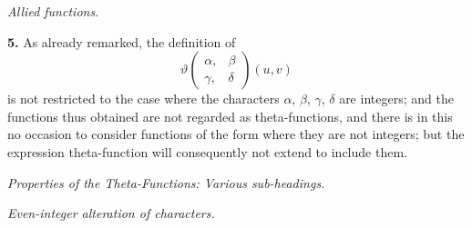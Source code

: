 \documentclass[11pt,a4paper]{book}
\begin{document}
\begin{center}
\textit{Allied functions.}
\end{center}

\vspace{0.5em}

\noindent\textbf{5.}\quad
As already remarked, the definition of
\[
\vartheta\begin{pmatrix} \alpha, & \beta \\ \gamma, & \delta \end{pmatrix}(u, v)
\]
is not restricted to the case where the characters $\alpha$, $\beta$, $\gamma$, $\delta$ are integers; and the functions thus obtained are not regarded as theta-functions, and there is in this no occasion to consider functions of the form where they are not integers; but the expression theta-function will consequently not extend to include them.

\vspace{1em}

\begin{center}
\textit{Properties of the Theta-Functions: Various sub-headings.}
\end{center}

\vspace{0.5em}

\begin{center}
\textit{Even-integer alteration of characters.}
\end{center}

\vspace{0.5em}
\end{document}
